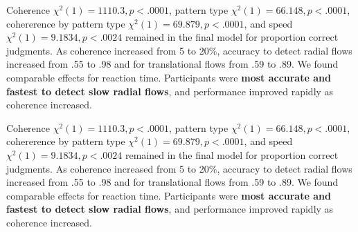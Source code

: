 \documentclass[landscape,final,a0paper,fontscale=0.285]{baposter}
\begin{document}
\begin{poster}
    {
      Coherence \(\chi^{2}(1)=1110.3, p<.0001\), pattern type \(\chi^{2}(1)=66.148, p<.0001\), cohererence by pattern type \(\chi^{2}(1)=69.879, p<.0001\), and speed \(\chi^{2}(1)=9.1834, p<.0024\) remained in the final model for proportion correct judgments.
      As coherence increased from 5 to 20\%, accuracy to detect radial flows increased from .55 to .98 and for translational flows from .59 to .89.
      We found comparable effects for reaction time.
      Participants were \textbf{most accurate and fastest to detect slow radial flows}, and performance improved  rapidly as coherence increased.

      \begin{center}

      \end{center}
    }

        {
          Coherence \(\chi^{2}(1)=1110.3, p<.0001\), pattern type \(\chi^{2}(1)=66.148, p<.0001\), cohererence by pattern type \(\chi^{2}(1)=69.879, p<.0001\), and speed \(\chi^{2}(1)=9.1834, p<.0024\) remained in the final model for proportion correct judgments.
          As coherence increased from 5 to 20\%, accuracy to detect radial flows increased from .55 to .98 and for translational flows from .59 to .89.
          We found comparable effects for reaction time.
          Participants were \textbf{most accurate and fastest to detect slow radial flows}, and performance improved  rapidly as coherence increased.

          \begin{center}

          \end{center}
        }
\end{poster}
\end{document}
